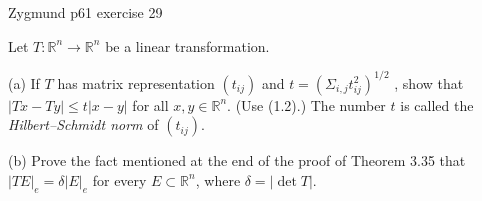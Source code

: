 \documentclass[UTF8,a4paper,10pt]{article}
\begin{document}
  \begin{Problem}[]{Zygmund p61 exercise 29}

Let \(T : \mathbb{R}^n → \mathbb{R}^n\) be a linear transformation.

(a) If \(T\) has matrix representation \((t_{ij})\) and \(t = (\Sigma_{i,j}t_{ij}^2)^{1/2}\) , show that \(|Tx - Ty| \leq t|x - y|\) for all \(x, y \in \mathbb{R}^n\). (Use (1.2).) The number \(t\) is called the \textit{Hilbert–Schmidt norm} of \((t_{ij})\).

(b) Prove the fact mentioned at the end of the proof of Theorem 3.35 that \(|TE|_e = \delta|E|_e\) for every \(E \subset \mathbb{R}^n\), where \(\delta  = |\det T|\).

  \end{Problem}

  \begin{solution}\,\\

        \begin{equation*}
      \begin{aligned}
      \end{aligned}
    \end{equation*}

  \end{solution}
\end{document}
